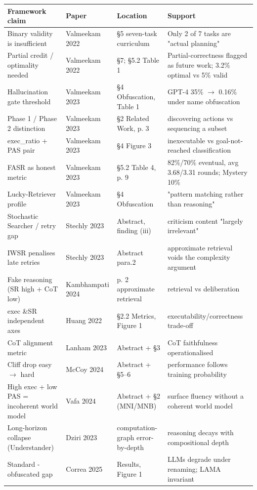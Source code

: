\begin{table}[h]\small
\centering
\begin{tabularx}{\linewidth}{@{}I P P I@{}}
\toprule
Framework claim & Paper & Location & Support\\
\midrule
Binary validity is insufficient & Valmeekam 2022 & \S{}5 seven-task curriculum & Only 2 of 7 tasks are "actual planning"\\
\addlinespace
Partial credit / optimality needed & Valmeekam 2022 & \S{}7; \S{}5.2 Table 1 & Partial-correctness flagged as future work; 3.2\% optimal vs 5\% valid\\
\addlinespace
Hallucination gate threshold & Valmeekam 2023 & \S{}4 Obfuscation, Table 1 & GPT-4 35\% \(\rightarrow\) 0.16\% under name obfuscation\\
\addlinespace
Phase 1 / Phase 2 distinction & Valmeekam 2023 & \S{}2 Related Work, p. 3 & discovering actions vs sequencing a subset\\
\addlinespace
exec\_ratio + PAS pair & Valmeekam 2023 & \S{}4 Figure 3 & inexecutable vs goal-not-reached classification\\
\addlinespace
FASR as honest metric & Valmeekam 2023 & \S{}5.2 Table 4, p. 9 & 82\%/70\% eventual, avg 3.68/3.31 rounds; Mystery 10\%\\
\addlinespace
Lucky-Retriever profile & Valmeekam 2023 & \S{}4 Obfuscation & "pattern matching rather than reasoning"\\
\addlinespace
Stochastic Searcher / retry gap & Stechly 2023 & Abstract, finding (iii) & criticism content "largely irrelevant"\\
\addlinespace
IWSR penalises late retries & Stechly 2023 & Abstract para.2 & approximate retrieval voids the complexity argument\\
\addlinespace
Fake reasoning (SR high + CoT low) & Kambhampati 2024 & p. 2 approximate retrieval & retrieval vs deliberation\\
\addlinespace
exec \&SR independent axes & Huang 2022 & \S{}2.2 Metrics, Figure 1 & executability/correctness trade-off\\
\addlinespace
CoT alignment metric & Lanham 2023 & Abstract + \S{}3 & CoT faithfulness operationalised\\
\addlinespace
Cliff drop easy \(\rightarrow\) hard & McCoy 2024 & Abstract + \S{}5--6 & performance follows training probability\\
\addlinespace
High exec + low PAS = incoherent world model & Vafa 2024 & Abstract + \S{}2 (MNI/MNB) & surface fluency without a coherent world model\\
\addlinespace
Long-horizon collapse (Understander) & Dziri 2023 & computation-graph error-by-depth & reasoning decays with compositional depth\\
\addlinespace
Standard - obfuscated gap & Correa 2025 & Results, Figure 1 & LLMs degrade under renaming; LAMA invariant\\
\bottomrule
\end{tabularx}
\end{table}

